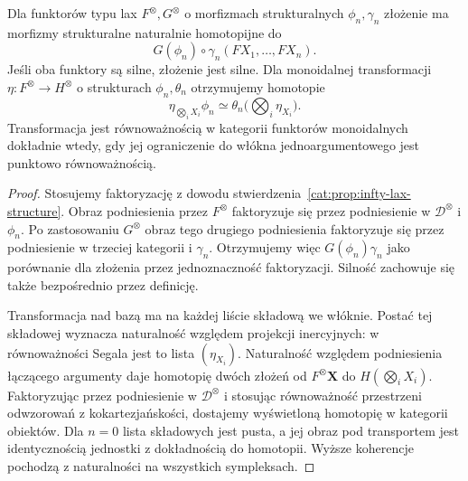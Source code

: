 \begin{stwierdzenie}\label{cat:prop:infty-lax-composition}
Dla funktorów typu lax $F^\otimes,G^\otimes$ o morfizmach strukturalnych $\phi_n,\gamma_n$ złożenie ma morfizmy strukturalne naturalnie homotopijne do
\[
 G(\phi_n)\circ\gamma_n(FX_1,\ldots,FX_n).
\]
Jeśli oba funktory są silne, złożenie jest silne. Dla monoidalnej transformacji $\eta:F^\otimes\to H^\otimes$ o strukturach $\phi_n,\theta_n$ otrzymujemy homotopie
\[
 \eta_{\bigotimes_i X_i}\phi_n
 \simeq\theta_n\bigl(\bigotimes_i\eta_{X_i}\bigr).
\]
Transformacja jest równoważnością w kategorii funktorów monoidalnych dokładnie wtedy, gdy jej ograniczenie do włókna jednoargumentowego jest punktowo równoważnością.
\end{stwierdzenie}
\begin{proof}
Stosujemy faktoryzację z dowodu stwierdzenia~\ref{cat:prop:infty-lax-structure}. Obraz podniesienia przez $F^\otimes$ faktoryzuje się przez podniesienie w $\mathcal D^\otimes$ i $\phi_n$. Po zastosowaniu $G^\otimes$ obraz tego drugiego podniesienia faktoryzuje się przez podniesienie w trzeciej kategorii i $\gamma_n$. Otrzymujemy więc $G(\phi_n)\gamma_n$ jako porównanie dla złożenia przez jednoznaczność faktoryzacji. Silność zachowuje się także bezpośrednio przez definicję.

Transformacja nad bazą ma na każdej liście składową we włóknie. Postać tej składowej wyznacza naturalność względem projekcji inercyjnych: w równoważności Segala jest to lista $(\eta_{X_i})$. Naturalność względem podniesienia łączącego argumenty daje homotopię dwóch złożeń od $F^\otimes\mathbf X$ do $H(\bigotimes_i X_i)$. Faktoryzując przez podniesienie w $\mathcal D^\otimes$ i stosując równoważność przestrzeni odwzorowań z kokartezjańskości, dostajemy wyświetloną homotopię w kategorii obiektów. Dla $n=0$ lista składowych jest pusta, a jej obraz pod transportem jest identycznością jednostki z dokładnością do homotopii. Wyższe koherencje pochodzą z naturalności na wszystkich sympleksach.


\end{proof}
